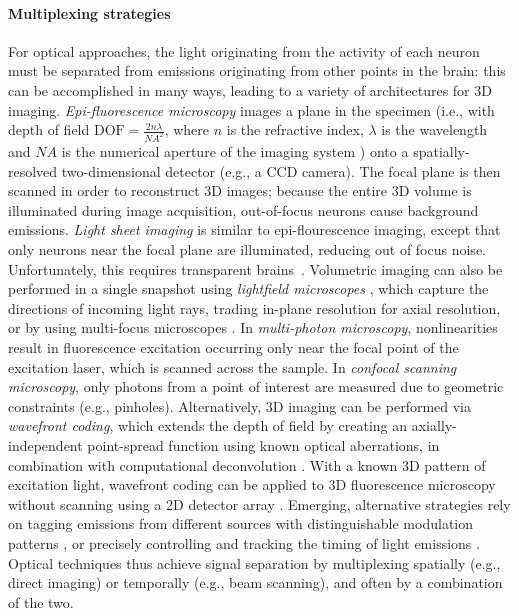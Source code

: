 \paragraph{Multiplexing strategies}
For optical approaches, the light originating from the activity of each neuron must be separated from emissions originating from other points in the brain: this can be accomplished in many ways, leading to a variety of architectures for 3D imaging.
\emph{Epi-fluorescence microscopy} images a plane in the specimen (i.e., with depth of field $\text{DOF} = \frac{2n \lambda}{NA^2}$, where $n$ is the refractive index, $\lambda$ is the wavelength and $NA$ is the numerical aperture of the imaging system \cite{quirin2013instantaneous}) onto a spatially-resolved two-dimensional detector (e.g., a CCD camera). The focal plane is then scanned in order to reconstruct 3D images; because the entire 3D volume is illuminated during image acquisition, out-of-focus neurons cause background emissions. \emph{Light sheet imaging} is similar to epi-flourescence imaging, except that only neurons near the focal plane are illuminated, reducing out of focus noise. Unfortunately, this requires transparent brains~\cite{ahrens13}. Volumetric imaging can also be performed in a single snapshot using \emph{lightfield microscopes} \cite{levoy2009recording, broxton2013wave}, which capture the directions of incoming light rays, trading in-plane resolution for axial resolution, or by using multi-focus microscopes \cite{abrahamsson2012fast}. In \emph{multi-photon microscopy}, nonlinearities result in fluorescence excitation occurring only near the focal point of the excitation laser, which is scanned across the sample. In \emph{confocal scanning microscopy}, only photons from a point of interest are measured due to geometric constraints (e.g., pinholes). Alternatively, 3D imaging can be performed via \emph{wavefront coding}, which extends the depth of field by creating an axially-independent point-spread function using known optical aberrations, in combination with computational deconvolution \cite{dowski1995extended}. With a known 3D pattern of excitation light, wavefront coding can be applied to 3D fluorescence microscopy without scanning using a 2D detector array \cite{quirin2013instantaneous}. Emerging, alternative strategies rely on tagging emissions from different sources with distinguishable modulation patterns \cite{wang12, diebold2013digitally, ducros2013encoded}, or precisely controlling and tracking the timing of light emissions \cite{cheng2011simultaneous}.
Optical techniques thus achieve signal separation by multiplexing spatially (e.g., direct imaging) or temporally (e.g., beam scanning), and often by a combination of the two.

